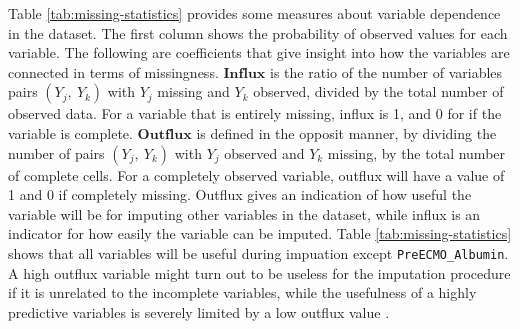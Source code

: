 \documentclass[12pt,]{article}
\begin{document}
Table \ref{tab:missing-statistics} provides some measures about variable
dependence in the dataset. The first column shows the probability of
observed values for each variable. The following are coefficients that
give insight into how the variables are connected in terms of
missingness. \(\mathbf{Influx}\) is the ratio of the number of variables
pairs \((Y_j, ~Y_k)\) with \(Y_j\) missing and \(Y_k\) observed, divided
by the total number of observed data. For a variable that is entirely
missing, influx is 1, and 0 for if the variable is complete.
\(\mathbf{Outflux}\) is defined in the opposit manner, by dividing the
number of pairs \((Y_j, ~Y_k)\) with \(Y_j\) observed and \(Y_k\)
missing, by the total number of complete cells. For a completely
observed variable, outflux will have a value of 1 and 0 if completely
missing. Outflux gives an indication of how useful the variable will be
for imputing other variables in the dataset, while influx is an
indicator for how easily the variable can be imputed. Table
\ref{tab:missing-statistics} shows that all variables will be useful
during impuation except \texttt{PreECMO\_Albumin}. A high outflux
variable might turn out to be useless for the imputation procedure if it
is unrelated to the incomplete variables, while the usefulness of a
highly predictive variables is severely limited by a low outflux value
\autocite*{van_buuren_flexible_2012}.
\end{document}
